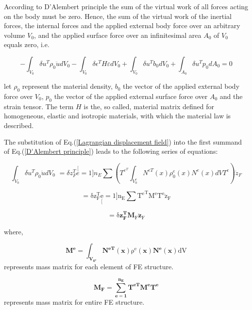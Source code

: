 According to D\textquoteright Alembert principle the sum of the virtual
work of all forces acting on the body must be zero. Hence, the sum
of the virtual work of the inertial forces, the internal forces and
the applied external body force over an arbitrary volume $V_{0}$,
and the applied surface force over an infinitesimal area $A_{0}$
of $V_{0}$ equals zero, i.e.


\begin{equation}
-\int_{V_{0}} \delta u^{T}\rho_{0}\textbf{$\ddot{u}$}dV_{0}-\int_{V_{0}}\delta\epsilon^{T}H\varepsilon dV_{0}+\int_{V_{0}}\delta u^{T} b_{0}dV_{0}+\int_{A_{0}}\delta u^{T}p_{0}dA_{0}=0\label{D'Alembert principle}
\end{equation}


let $\rho_{0}$ represent the material density, $b_{0}$ the vector
of the applied external body force over $V_{0}$, $p_{0}$ the vector
of the applied external surface force over $A_{0}$ and the strain
tensor. The term $H$ is the, so called, material matrix defined for
homogeneous, elastic and isotropic materials, with which the material
law is described.

The substitution of Eq.(\ref{Lagrangian displacement field}) into
the first summand of Eq.(\ref{D'Alembert principle}) leads to the
following series of equations: 

\begin{equation}
\int_{V_{0}}\delta u^{T}\rho_{0}\textbf{$\ddot{u}$}dV_{0}\,\,=\delta z_{F}^{T}\stackrel[e=1]{n_{E}}{\sum}\left(T^{e^{T}}\int_{V_{0}^{e}}N^{eT}(x)\rho_{0}^{e}(x)N^{e}(x)dVT^{e}\right)\ddot{z}_{F}
\end{equation}

\begin{equation}
\mathrm{=\delta z_{F}^{T}\underset[e=1]{n_{E}}{\sum}{T^{e}}^{T}M^{e}T^{e}\ddot{z}_{F}}
\end{equation}

\begin{equation}
\mathrm{=\delta\boldsymbol{z_{F}^{T}}\boldsymbol{M}_{F}\ddot{\boldsymbol{z}}_{F}}\label{first term of D'Alembert principle}
\end{equation}

where,

\[
\mathrm{\mathbf{M^{e}=\int_{\mathbf{V_{0^{e}}}}N^{eT}}(\mathbf{x})\rho^{e}(\mathbf{x})\mathbf{N^{e}}(\mathbf{x})dV}
\]
represents mass matrix for each element of FE structure.

\[
\mathbf{M_{F}=\sum_{e=1}^{n_{E}}T^{eT}M^{e}T^{e}}
\]
represents mass matrix for entire FE structure.

